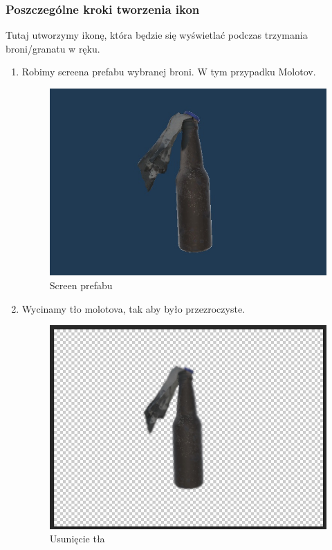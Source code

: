 \subsubsection{Poszczególne kroki tworzenia ikon}
Tutaj utworzymy ikonę, która będzie się wyświetlać podczas trzymania broni/granatu w ręku.
\begin{enumerate}
  \item Robimy screena prefabu wybranej broni. W tym przypadku Molotov.
\begin{figure}[h]
    \centering
    \includegraphics[scale=0.5]{Images/MolotovScreen.jpg}
    \caption{Screen prefabu}
    \label{fig:visBuglist}
\end{figure}
\FloatBarrier

  \item Wycinamy tło molotova, tak aby było przezroczyste.
\begin{figure}[h]
    \centering
    \includegraphics[scale=0.5]{Images/MolotovPNG.jpg}
    \caption{Usunięcie tła}
    \label{fig:visBuglist}
\end{figure}
\FloatBarrier


\end{enumerate}
